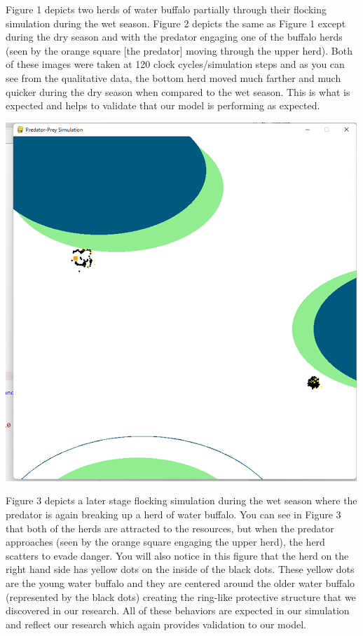 \documentclass[12pt]{article}
\begin{document}
Figure 1 depicts two herds of water buffalo partially through their flocking simulation during the wet season. Figure 2 depicts the same as Figure 1 except during the dry season and with the predator engaging one of the buffalo herds (seen by the orange square [the predator] moving through the upper herd). Both of these images were taken at 120 clock cycles/simulation steps and  as you can see from the qualitative data, the bottom herd moved much farther and much quicker during the dry season when compared to the wet season. This is what is expected and helps to validate that our model is performing as expected.

\begin{center}
\includegraphics[scale=.5]{figure3.png}%
\label{labelname}%
\end{center}

Figure 3 depicts a later stage flocking simulation during the wet season where the predator is again breaking up a herd of water buffalo. You can see in Figure 3 that both of the herds are attracted to the resources, but when the predator approaches (seen by the orange square engaging the upper herd), the herd scatters to evade danger. You will also notice in this figure that the herd on the right hand side has yellow dots on the inside of the black dots. These yellow dots are the young water buffalo and they are centered around the older water buffalo (represented by the black dots) creating the ring-like protective structure that we discovered in our research. All of these behaviors are expected in our simulation and reflect our research which again provides validation to our model.
\end{document}
